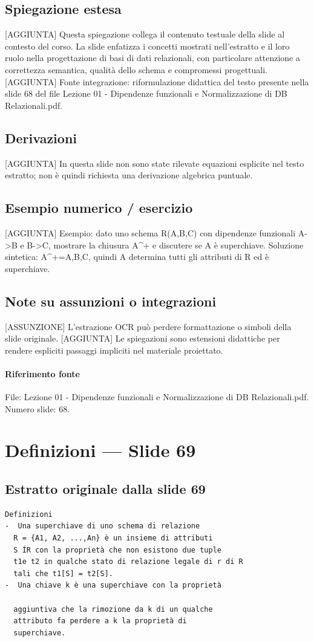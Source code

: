 \documentclass[11pt]{article}
\begin{document}
\subsection*{Spiegazione estesa}
[AGGIUNTA] Questa spiegazione collega il contenuto testuale della slide al contesto del corso. La slide enfatizza i concetti mostrati nell'estratto e il loro ruolo nella progettazione di basi di dati relazionali, con particolare attenzione a correttezza semantica, qualità dello schema e compromessi progettuali.
[AGGIUNTA] Fonte integrazione: riformulazione didattica del testo presente nella slide 68 del file Lezione 01 - Dipendenze funzionali e Normalizzazione di DB Relazionali.pdf.
\subsection*{Derivazioni}
[AGGIUNTA] In questa slide non sono state rilevate equazioni esplicite nel testo estratto; non è quindi richiesta una derivazione algebrica puntuale.
\subsection*{Esempio numerico / esercizio}
[AGGIUNTA] Esempio: dato uno schema R(A,B,C) con dipendenze funzionali A->B e B->C, mostrare la chiusura A^+ e discutere se A è superchiave. Soluzione sintetica: A^+={A,B,C}, quindi A determina tutti gli attributi di R ed è superchiave.
\subsection*{Note su assunzioni o integrazioni}
[ASSUNZIONE] L'estrazione OCR può perdere formattazione o simboli della slide originale.
[AGGIUNTA] Le spiegazioni sono estensioni didattiche per rendere espliciti passaggi impliciti nel materiale proiettato.
\paragraph{Riferimento fonte} File: Lezione 01 - Dipendenze funzionali e Normalizzazione di DB Relazionali.pdf. Numero slide: 68.
\section{Definizioni --- Slide 69}
\subsection*{Estratto originale dalla slide 69}
\begin{lstlisting}
Definizioni
-  Una superchiave di uno schema di relazione
  R = {A1, A2, ...,An} è un insieme di attributi
  S ÍR con la proprietà che non esistono due tuple
  t1e t2 in qualche stato di relazione legale di r di R
  tali che t1[S] = t2[S].
-  Una chiave k è una superchiave con la proprietà

  aggiuntiva che la rimozione da k di un qualche
  attributo fa perdere a k la proprietà di
  superchiave.
\end{lstlisting}
\end{document}
